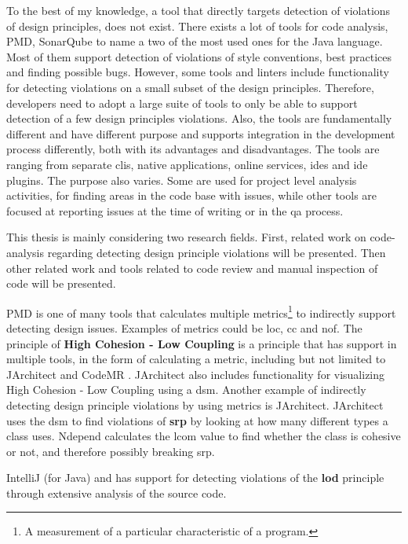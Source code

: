 \documentclass{report}
\begin{document}
To the best of my knowledge, a tool that directly targets detection of violations of design principles, does not exist. There exists a lot of tools for code analysis, PMD\cite{pmd}, SonarQube\cite{sonarqube} to name a two of the most used ones for the Java language. Most of them support detection of violations of style conventions, best practices and finding possible bugs. However, some tools and linters include functionality for detecting violations on a small subset of the design principles. Therefore, developers need to adopt a large suite of tools to only be able to support detection of a few design principles violations. Also, the tools are fundamentally different and have different purpose and supports integration in the development process differently, both with its advantages and disadvantages. The tools are ranging from separate \gls{cli}s, native applications, online services, \gls{ide}s and \gls{ide} plugins. The purpose also varies. Some are used for project level analysis activities, for finding areas in the code base with issues, while other tools are focused at reporting issues at the time of writing or in the \gls{qa} process. 

This thesis is mainly considering two research fields. First, related work on code-analysis regarding detecting design principle violations will be presented. Then other related work and tools related to code review and manual inspection of code will be presented.

PMD \cite{pmd} is one of many tools that calculates multiple metrics\footnote{A measurement of a particular characteristic of a program.} to indirectly support detecting design issues. Examples of metrics could be \gls{loc}, \gls{cc} and \gls{nof}. The principle of \textbf{High Cohesion - Low Coupling} is a principle that has support in multiple tools, in the form of calculating a metric, including but not limited to JArchitect \cite{jarchitect} and CodeMR \cite{codemr}. JArchitect \cite{jarchitect} also includes functionality for visualizing  High Cohesion - Low Coupling using a \gls{dsm}. Another example of indirectly detecting design principle violations by using metrics is JArchitect. JArchitect uses the \gls{dsm} to find violations of \textbf{\gls{srp}} by looking at how many different types a class uses. Ndepend \cite{ndepend} calculates the \gls{lcom} value to find whether the class is cohesive or not, and therefore possibly breaking \gls{srp}. 

IntelliJ \cite{IntelliJ} (for Java) and \cite{pmd} has support for detecting violations of the \textbf{\gls{lod}} principle through extensive analysis of the source code.
\end{document}
